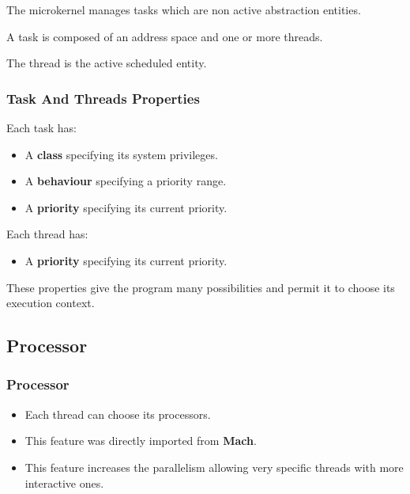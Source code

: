 {\begin{frame}
  \nl

  The microkernel manages tasks which are non active abstraction entities.

  \nl

  A task is composed of an address space and one or more threads.

  \nl

  The thread is the active scheduled entity.
\end{frame}


\begin{frame}
  \frametitle{Task And Threads Properties}

  Each task has:

  \begin{itemize}
    \item
      A \textbf{class} specifying its system privileges.
    \item
      A \textbf{behaviour} specifying a priority range.
    \item
      A \textbf{priority} specifying its current priority.
  \end{itemize}

  \nl

  Each thread has:

  \begin{itemize}
    \item
      A \textbf{priority} specifying its current priority.
  \end{itemize}

  \nl

  These properties give the program many possibilities and
  permit it to choose its execution context.
\end{frame}

%
%

\subsection{Processor}


\begin{frame}
  \frametitle{Processor}

  \begin{itemize}
    \item
      Each thread can choose its processors.
    \item
      This feature was directly imported from \textbf{Mach}.
    \item
      This feature increases the parallelism allowing very
      specific threads with more interactive ones.
  \end{itemize}


\end{frame}}
